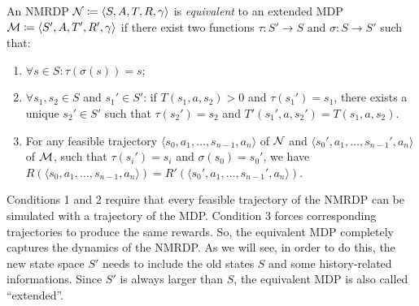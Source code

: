 \begin{definition}
	\cite{bib:nmrdp-logic-first} An NMRDP $\mathcal{N} \coloneqq \langle S, A, T, R,
	\gamma \rangle$ is \emph{equivalent} to an extended MDP $\mathcal{M} \coloneqq
	\langle S', A, T', R', \gamma \rangle$ if there exist two functions
	$\tau: S' \to S$ and $\sigma: S \to S'$ such that:
	\begin{enumerate}
		\item $\forall s \in S : \tau(\sigma(s)) = s$;
		\item $\forall s_1, s_2 \in S$ and $s_1' \in S'$: if $T(s_1, a, s_2) > 0$
			and $\tau(s_1') = s_1$, there exists a unique $s_2' \in S'$ such that
			$\tau(s_2') = s_2$ and $T'(s_1', a, s_2') = T(s_1, a, s_2)$.
		\item For any feasible trajectory $\langle s_0, a_1, \dots, s_{n-1}, a_n
			\rangle$ of $\mathcal{N}$ and $\langle s_0', a_1, \dots, s_{n-1}', a_n
			\rangle$ of $\mathcal{M}$, such that $\tau(s_i') = s_i$ and $\sigma(s_0) =
			s_0'$, we have $R(\langle s_0, a_1, \dots, s_{n-1}, a_n
			\rangle) = R'(\langle s_0', a_1, \dots, s_{n-1}', a_n \rangle)$.
	\end{enumerate}
	\label{def:nmrdp-mdp-equiv}
\end{definition}
Conditions 1 and 2 require that every feasible trajectory of the NMRDP can be
simulated with a trajectory of the MDP. Condition 3 forces corresponding
trajectories to produce the same rewards. So, the equivalent MDP completely
captures the dynamics of the NMRDP. As we will see, in order to do this, the
new state space $S'$ needs to include the old states $S$ and some
history-related informations. Since $S'$ is always larger than $S$, the
equivalent MDP is also called ``extended''.

